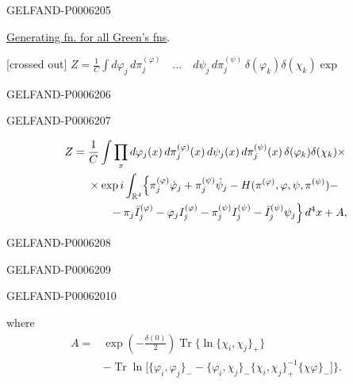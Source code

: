 \begin{GelfandAdjacentEvidence}{GELFAND-P000620}{5}


\underline{Generating fn. for all Green’s fns}.
\begin{center}
[crossed out]
\sout{\(Z=\frac1C\int d\varphi_j\,d\pi_j^{(\varphi)}
\quad\ldots\quad d\psi_j\,d\pi_j^{(\psi)}
\,\delta(\varphi_k)\delta(\chi_k)\exp\)}
\end{center}
\end{GelfandAdjacentEvidence}
\begin{GelfandAdjacentEvidence}{GELFAND-P000620}{6}

\end{GelfandAdjacentEvidence}
\begin{GelfandAdjacentEvidence}{GELFAND-P000620}{7}

\[
\begin{aligned}
Z={}&\frac1C\int\prod_x d\varphi_j(x)\,d\pi_j^{(\varphi)}(x)\,
d\psi_j(x)\,d\pi_j^{(\psi)}(x)\,\delta(\varphi_k)\delta(\chi_k)\times\\
&\times\exp i\int_{\mathbb R^4}\Bigl\{
\pi_j^{(\varphi)}\dot\varphi_j+\pi_j^{(\psi)}\dot\psi_j
-H(\pi^{(\varphi)},\varphi,\psi,\pi^{(\psi)})-\\
&\qquad-\pi_j\bar I_j^{(\varphi)}-\varphi_j I_j^{(\varphi)}
-\pi_j^{(\psi)} I_j^{(\psi)}
-\bar I_j^{(\psi)}\psi_j\Bigr\}\,d^4x+A,
\end{aligned}
\]
\end{GelfandAdjacentEvidence}
\begin{GelfandAdjacentEvidence}{GELFAND-P000620}{8}

\end{GelfandAdjacentEvidence}
\begin{GelfandAdjacentEvidence}{GELFAND-P000620}{9}

\end{GelfandAdjacentEvidence}
\begin{GelfandAdjacentEvidence}{GELFAND-P000620}{10}


where
\[
\begin{aligned}
A={}&\exp\left(-\frac{\delta(0)}2\right)\operatorname{Tr}
\bigl\{\ln\{\chi_i,\chi_j\}_+\bigr\}\\
&-\operatorname{Tr}\ln\bigl[\{\varphi_i,\varphi_j\}_-
-\{\varphi_i,\chi_j\}_-\{\chi_i,\chi_j\}_+^{-1}\{\chi\varphi\}_-\bigr]\Bigr\}.
\end{aligned}
\]
\end{GelfandAdjacentEvidence}
